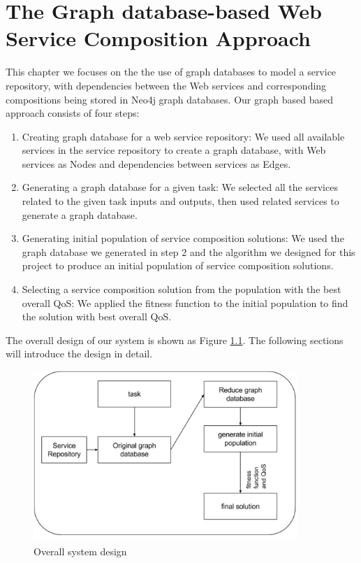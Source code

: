 \chapter{The Graph database-based Web Service Composition Approach}\label{C:wd}
This chapter we focuses on the the use of graph databases to model a service repository, with dependencies between the Web services and corresponding compositions being stored in Neo4j graph databases. Our graph based based approach consists of four steps:\par
\begin{enumerate}
  \item Creating graph database for a web service repository: We used all available services in the service repository to create a graph database, with Web services as Nodes and dependencies between services as Edges.\par

  \item Generating a graph database for a given task: We selected all the services related to the given task inputs and outputs, then used related services to generate a graph database.\par

  \item Generating initial population of service composition solutions: We used the graph database we generated in step 2 and the algorithm we designed for this project to produce an initial population of service composition solutions.\par

  \item Selecting a service composition solution from the population with the best overall QoS: We applied the fitness function to the initial population to find the solution with best overall QoS.\par

\end{enumerate}

The overall design of our system is shown as Figure \ref{fig:process}. The following sections will introduce the design in detail.\par
\begin{figure}[h]
\includegraphics[width=10cm]{process.pdf}
\centering
\caption{Overall system design}
\label{fig:process} 
\end{figure} 

